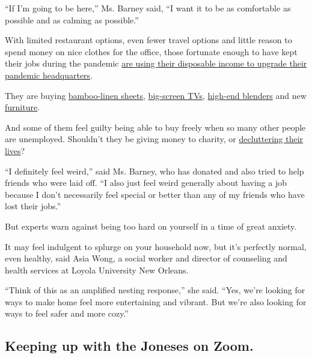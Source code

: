 ``If I'm going to be here,'' Ms. Barney said, ``I want it to be as
comfortable as possible and as calming as possible.''

With limited restaurant options, even fewer travel options and little
reason to spend money on nice clothes for the office, those fortunate
enough to have kept their jobs during the pandemic
\href{https://www.forbes.com/sites/elizabethfazzare/2020/06/27/retailers-report-that-pandemic-shoppers-are-buying-more-home-and-design-products/\#673de1824436}{are
using their disposable income to upgrade their pandemic headquarters}.

They are buying
\href{https://www.jpost.com/special-content/bamboo-material-could-improve-hygiene-during-coronavirus-636461}{bamboo-linen
sheets},
\href{https://www.usatoday.com/story/tech/2020/07/20/coronavirus-effect-big-tvs-have-helped-some-homes-navigate-pandemic/5432582002/}{big-screen
TVs},
\href{https://www.nytimes3xbfgragh.onion/wirecutter/reviews/best-blender/}{high-end
blenders} and new
\href{https://www.kmbc.com/article/with-more-people-home-during-pandemic-furniture-stores-are-busy/33383497}{furniture}.

And some of them feel guilty being able to buy freely when so many other
people are unemployed. Shouldn't they be giving money to charity, or
\href{https://www.washingtonpost.com/lifestyle/home/the-big-pandemic-clean-out-clearing-the-junk-out-of-your-home-while-stuck-there/2020/08/04/230d71d2-c868-11ea-a99f-3bbdffb1af38_story.html}{decluttering
their lives}?

``I definitely feel weird,'' said Ms. Barney, who has donated and also
tried to help friends who were laid off. ``I also just feel weird
generally about having a job because I don't necessarily feel special or
better than any of my friends who have lost their jobs.''

But experts warn against being too hard on yourself in a time of great
anxiety.

It may feel indulgent to splurge on your household now, but it's
perfectly normal, even healthy, said Asia Wong, a social worker and
director of counseling and health services at Loyola University New
Orleans.

``Think of this as an amplified nesting response,'' she said. ``Yes,
we're looking for ways to make home feel more entertaining and vibrant.
But we're also looking for ways to feel safer and more cozy.''

\hypertarget{keeping-up-with-the-joneses-on-zoom}{%
\subsection{Keeping up with the Joneses on
Zoom.}\label{keeping-up-with-the-joneses-on-zoom}}


